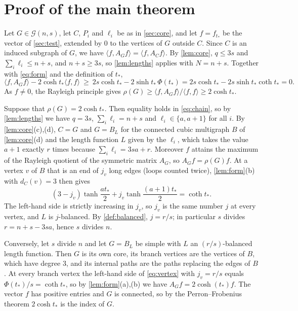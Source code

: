 \documentclass[11pt]{article}
\theoremstyle{definition}
\theoremstyle{remark}
\newcommand{\G}{\mathcal{G}}
\begin{document}
\section{Proof of the main theorem}\label{sec:proof}

Let $G\in\G(n,s)$, let $C$, $P_i$ and $\ell_i$ be as in \cref{sec:core}, and let $f=f_{t_*}$ be the vector of
\cref{sec:test}, extended by $0$ to the vertices of $G$ outside $C$. Since $C$ is an induced subgraph of $G$, we have
$\langle f,A_Gf\rangle=\langle f,A_Cf\rangle$. By \cref{lem:core}, $q\le3s$ and $\sum_i\ell_i\le n+s$, and
$n+s\ge3s$, so \cref{lem:lengths} applies with $N=n+s$. Together with \eqref{eq:form} and the definition of $t_*$,
\begin{equation}\label{eq:chain}
\langle f,A_Gf\rangle-2\cosh t_*\langle f,f\rangle\ \ge\ 2s\cosh t_*-2\sinh t_*\,\Phi(t_*)=2s\cosh t_*-2s\sinh t_*\coth t_*=0 .
\end{equation}
As $f\ne0$, the Rayleigh principle gives $\rho(G)\ge\langle f,A_Gf\rangle/\langle f,f\rangle\ge2\cosh t_*$.

Suppose that $\rho(G)=2\cosh t_*$. Then equality holds in \eqref{eq:chain}, so by \cref{lem:lengths} we have
$q=3s$, $\sum_i\ell_i=n+s$ and $\ell_i\in\{a,a+1\}$ for all $i$. By \cref{lem:core}(c),(d), $C=G$ and $G=B_L$ for the
connected cubic multigraph $B$ of \cref{lem:core}(d) and the length function $L$ given by the $\ell_i$, which takes the
value $a+1$ exactly $r$ times because $\sum_i\ell_i=3sa+r$. Moreover $f$ attains the maximum of the Rayleigh
quotient of the symmetric matrix $A_G$, so $A_Gf=\rho(G)f$. At a vertex $v$ of $B$ that is an end of $j_v$ long edges
(loops counted twice), \cref{lem:form}(b) with $d_C(v)=3$ then gives
\begin{equation}\label{eq:vertex}
(3-j_v)\tanh\frac{at_*}{2}+j_v\tanh\frac{(a+1)t_*}{2}=\coth t_* .
\end{equation}
The left-hand side is strictly increasing in $j_v$, so $j_v$ is the same number $j$ at every vertex, and
$L$ is $j$-balanced. By \cref{def:balanced}, $j=r/s$; in particular $s$ divides $r=n+s-3sa$, hence $s$ divides $n$.

Conversely, let $s$ divide $n$ and let $G=B_L$ be simple with $L$ an $(r/s)$-balanced length function. Then $G$ is
its own core, its branch vertices are the vertices of $B$, which have degree $3$, and its internal paths are the paths
replacing the edges of $B$. At every branch vertex the left-hand side of \eqref{eq:vertex} with $j_v=r/s$ equals
$\Phi(t_*)/s=\coth t_*$, so by \cref{lem:form}(a),(b) we have $A_Gf=2\cosh(t_*)f$. The vector $f$ has positive
entries and $G$ is connected, so by the Perron--Frobenius theorem $2\cosh t_*$ is the index of $G$.
\end{document}
